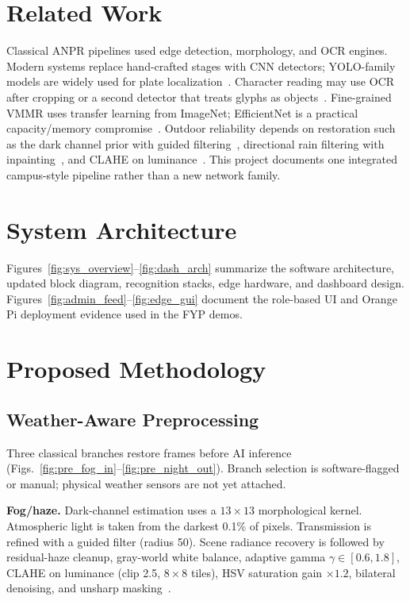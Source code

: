 \documentclass[10pt, conference]{IEEEtran}
\begin{document}
\section{Related Work}
\label{sec:related}
Classical ANPR pipelines used edge detection, morphology, and OCR engines. Modern systems replace hand-crafted stages with CNN detectors; YOLO-family models are widely used for plate localization~\cite{redmon2018yolov3,bochkovskiy2020yolov4,ultralytics2023yolov8}. Character reading may use OCR after cropping or a second detector that treats glyphs as objects~\cite{thapliyal2023alpr}. Fine-grained VMMR uses transfer learning from ImageNet; EfficientNet is a practical capacity/memory compromise~\cite{tan2019efficientnet}. Outdoor reliability depends on restoration such as the dark channel prior with guided filtering~\cite{he2009dcp,he2010guided,he2011dcp}, directional rain filtering with inpainting~\cite{telea2004}, and CLAHE on luminance~\cite{zuiderveld1994clahe}. This project documents one integrated campus-style pipeline rather than a new network family.

\section{System Architecture}
\label{sec:system}
Figures~\ref{fig:sys_overview}--\ref{fig:dash_arch} summarize the software architecture, updated block diagram, recognition stacks, edge hardware, and dashboard design. Figures~\ref{fig:admin_feed}--\ref{fig:edge_gui} document the role-based UI and Orange Pi deployment evidence used in the FYP demos.

\section{Proposed Methodology}
\label{sec:method}
\subsection{Weather-Aware Preprocessing}
Three classical branches restore frames before AI inference (Figs.~\ref{fig:pre_fog_in}--\ref{fig:pre_night_out}). Branch selection is software-flagged or manual; physical weather sensors are not yet attached.

\textbf{Fog/haze.} Dark-channel estimation uses a $13\times13$ morphological kernel. Atmospheric light is taken from the darkest 0.1\% of pixels. Transmission is refined with a guided filter (radius 50). Scene radiance recovery is followed by residual-haze cleanup, gray-world white balance, adaptive gamma $\gamma\in[0.6,1.8]$, CLAHE on luminance (clip 2.5, $8\times8$ tiles), HSV saturation gain $\times1.2$, bilateral denoising, and unsharp masking~\cite{he2009dcp,he2010guided}.
\end{document}
